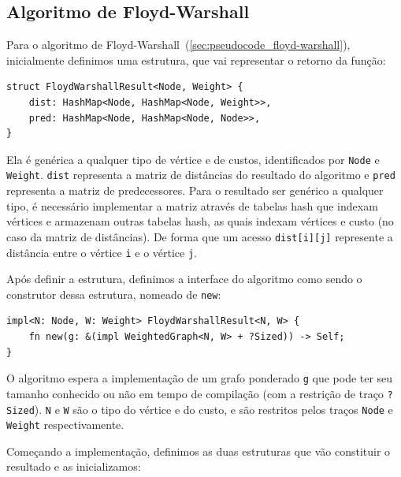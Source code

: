 \subsection{Algoritmo de Floyd-Warshall}
\label{sec:code_floyd-warshall}

Para o algoritmo de
Floyd-Warshall~(\ref{sec:pseudocode_floyd-warshall}), inicialmente definimos uma
estrutura, que vai representar o retorno da função:

\begin{listing}[H]
  \caption{Estrutura de resultado do Algoritmo Floyd-Warshall}
\begin{verbatim}
struct FloydWarshallResult<Node, Weight> {
    dist: HashMap<Node, HashMap<Node, Weight>>,
    pred: HashMap<Node, HashMap<Node, Node>>,
}
\end{verbatim}
\end{listing}

Ela é genérica a qualquer tipo de vértice e de custos, identificados por
\texttt{Node} e \texttt{Weight}. \texttt{dist} representa a matriz de
distâncias do resultado do algoritmo e \texttt{pred} representa a
matriz de predecessores. Para o resultado ser genérico a qualquer
tipo, é necessário implementar a matriz através de tabelas hash que
indexam vértices e armazenam outras tabelas hash, as quais indexam vértices e
custo (no caso da matriz de distâncias). De forma que um acesso
\texttt{dist[i][j]} represente a
distância entre o vértice \texttt{i} e o vértice \texttt{j}.

Após definir a estrutura, definimos a interface do algoritmo como sendo o
construtor dessa estrutura, nomeado de \texttt{new}:
\begin{listing}[H]
  \caption{Interface do algoritmo de Floyd-Warshall}
  \label{code:interface_floydwarshall}
\begin{verbatim}
impl<N: Node, W: Weight> FloydWarshallResult<N, W> {
    fn new(g: &(impl WeightedGraph<N, W> + ?Sized)) -> Self;
}
\end{verbatim}
\end{listing}

O algoritmo espera a implementação de um grafo ponderado \texttt{g}
que pode ter seu tamanho conhecido ou não em tempo de compilação (com
a restrição de traço \texttt{?Sized}). \texttt{N} e \texttt{W} são o
tipo do vértice e do custo, e são restritos pelos traços
\texttt{Node} e \texttt{Weight} respectivamente.

Começando a implementação, definimos as duas estruturas que vão
constituir o resultado e as inicializamos:

